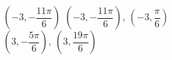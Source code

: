 { $\left( -3, -\dfrac{11\pi}{6} \right)$}
{$\left( -3, -\dfrac{11\pi}{6} \right), \, \left( -3, \dfrac{\pi}{6} \right)$\\$\left(3, -\dfrac{5\pi}{6} \right), \, \left( 3, \dfrac{19\pi}{6} \right)$\\ }
